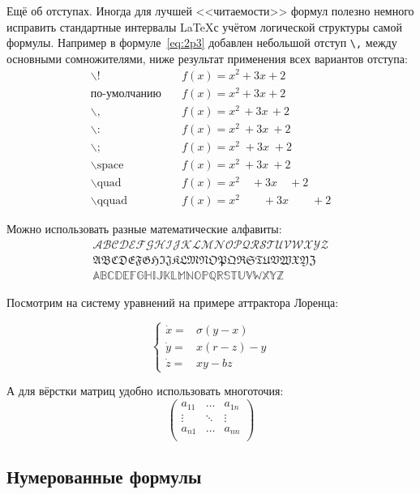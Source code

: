 Ещё об отступах. Иногда для лучшей <<читаемости>> формул полезно
немного исправить стандартные интервалы \LaTeX с учётом логической
структуры самой формулы. Например в формуле~\ref{eq:2p3} добавлен
небольшой отступ \verb+\,+ между основными сомножителями, ниже
результат применения всех вариантов отступа:
\begin{align*}
\backslash! &\quad f(x) = x^2\! +3x\! +2 \\
  \mbox{по-умолчанию} &\quad f(x) = x^2+3x+2 \\
\backslash, &\quad f(x) = x^2\, +3x\, +2 \\
\backslash{:} &\quad f(x) = x^2\: +3x\: +2 \\
\backslash; &\quad f(x) = x^2\; +3x\; +2 \\
\backslash \mbox{space} &\quad f(x) = x^2\ +3x\ +2 \\
\backslash \mbox{quad} &\quad f(x) = x^2\quad +3x\quad +2 \\
\backslash \mbox{qquad} &\quad f(x) = x^2\qquad +3x\qquad +2
\end{align*}


Можно использовать разные математические алфавиты:
\begin{align}
\mathcal{ABCDEFGHIJKLMNOPQRSTUVWXYZ} \nonumber \\
\mathfrak{ABCDEFGHIJKLMNOPQRSTUVWXYZ} \nonumber \\
\mathbb{ABCDEFGHIJKLMNOPQRSTUVWXYZ} \nonumber
\end{align}

Посмотрим на систему уравнений на примере аттрактора Лоренца:

\[ 
\left\{
  \begin{array}{rl}
    \dot x = & \sigma (y-x) \\
    \dot y = & x (r - z) - y \\
    \dot z = & xy - bz
  \end{array}
\right.
\]

А для вёрстки матриц удобно использовать многоточия:
\[ 
\left(
  \begin{array}{ccc}
  	a_{11} & \ldots & a_{1n} \\
  	\vdots & \ddots & \vdots \\
  	a_{n1} & \ldots & a_{nn} \\
  \end{array}
\right)
\]


\subsection{Нумерованные формулы} \label{subsect1_3_3}

